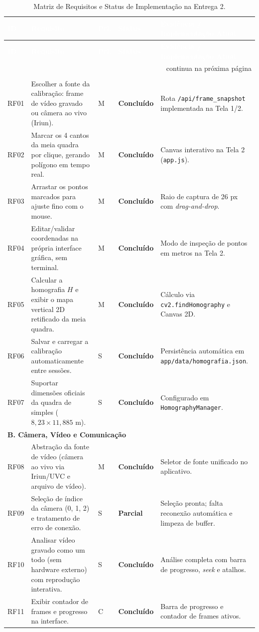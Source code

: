 \documentclass[a4paper,11pt]{article}
\newcommand{\stok}{\textcolor{acerto}{\textbf{Concluído}}}
\newcommand{\stpar}{\textcolor{parcial}{\textbf{Parcial}}}
\newcommand{\req}[5]{#1 & #2 & \centering #3 & \centering #4 & #5 \\ \hline}
\newcommand{\reccat}[1]{\multicolumn{5}{|l|}{\cellcolor{blue!14}\textbf{#1}} \\ \hline}
\begin{document}
\begin{center}
\scriptsize
\renewcommand{\arraystretch}{1.24}
\begin{longtable}{|p{1.1cm}|p{6.8cm}|p{0.7cm}|p{1.6cm}|p{4.8cm}|}
\caption{Matriz de Requisitos e Status de Implementação na Entrega 2.}\label{tab:req}\\
\hline
\rowcolor{primary}\textcolor{white}{\textbf{ID}} & \textcolor{white}{\textbf{Requisito}} & \textcolor{white}{\textbf{Pri.}} & \textcolor{white}{\textbf{Status}} & \textcolor{white}{\textbf{Evidência / Implementação Atual}} \\ \hline
\endfirsthead
\hline
\rowcolor{primary}\textcolor{white}{\textbf{ID}} & \textcolor{white}{\textbf{Requisito}} & \textcolor{white}{\textbf{Pri.}} & \textcolor{white}{\textbf{Status}} & \textcolor{white}{\textbf{Evidência / Implementação Atual}} \\ \hline
\endhead
\hline \multicolumn{5}{r}{\tiny continua na próxima página} \\
\endfoot
\hline
\endlastfoot

\reccat{A. Mapeamento da Quadra e Homografia}
\req{RF01}{Escolher a fonte da calibração: frame de vídeo gravado ou câmera ao vivo (Iriun).}{M}{\stok}{Rota \texttt{/api/frame\_snapshot} implementada na Tela 1/2.}
\req{RF02}{Marcar os 4 cantos da meia quadra por clique, gerando polígono em tempo real.}{M}{\stok}{Canvas interativo na Tela 2 (\texttt{app.js}).}
\req{RF03}{Arrastar os pontos marcados para ajuste fino com o mouse.}{M}{\stok}{Raio de captura de 26 px com \textit{drag-and-drop}.}
\req{RF04}{Editar/validar coordenadas na própria interface gráfica, sem terminal.}{M}{\stok}{Modo de inspeção de pontos em metros na Tela 2.}
\req{RF05}{Calcular a homografia $H$ e exibir o mapa vertical 2D retificado da meia quadra.}{M}{\stok}{Cálculo via \texttt{cv2.findHomography} e Canvas 2D.}
\req{RF06}{Salvar e carregar a calibração automaticamente entre sessões.}{S}{\stok}{Persistência automática em \texttt{app/data/homografia.json}.}
\req{RF07}{Suportar dimensões oficiais da quadra de simples ($8{,}23 \times 11{,}885\text{ m}$).}{S}{\stok}{Configurado em \texttt{HomographyManager}.}

\reccat{B. Câmera, Vídeo e Comunicação}
\req{RF08}{Abstração da fonte de vídeo (câmera ao vivo via Iriun/UVC e arquivo de vídeo).}{M}{\stok}{Seletor de fonte unificado no aplicativo.}
\req{RF09}{Seleção de índice da câmera (0, 1, 2) e tratamento de erro de conexão.}{S}{\stpar}{Seleção pronta; falta reconexão automática e limpeza de buffer.}
\req{RF10}{Analisar vídeo gravado como um todo (sem hardware externo) com reprodução interativa.}{S}{\stok}{Análise completa com barra de progresso, \textit{seek} e atalhos.}
\req{RF11}{Exibir contador de frames e progresso na interface.}{C}{\stok}{Barra de progresso e contador de frames ativos.}


\end{longtable}
\end{center}
\end{document}
